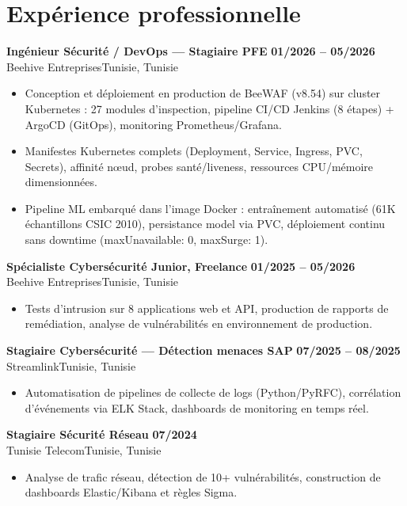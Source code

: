 \documentclass[a4paper,10pt]{article}
\newcommand{\cventry}[4]{\textbf{#1} \hfill \textbf{#4}\\[1pt]#2{\ifx\relax#3\relax\else, #3\fi}\par\vspace{1pt}}
\begin{document}
\section{Expérience professionnelle}
\cventry{Ingénieur Sécurité / DevOps --- Stagiaire PFE}{Beehive Entreprises}{Tunisie}{01/2026 -- 05/2026}
\begin{itemize}
  \item Conception et déploiement en production de BeeWAF (v8.54) sur cluster Kubernetes : 27 modules d'inspection, pipeline CI/CD Jenkins (8 étapes) + ArgoCD (GitOps), monitoring Prometheus/Grafana.
  \item Manifestes Kubernetes complets (Deployment, Service, Ingress, PVC, Secrets), affinité nœud, probes santé/liveness, ressources CPU/mémoire dimensionnées.
  \item Pipeline ML embarqué dans l'image Docker : entraînement automatisé (61K échantillons CSIC 2010), persistance model via PVC, déploiement continu sans downtime (maxUnavailable: 0, maxSurge: 1).
\end{itemize}
\cventry{Spécialiste Cybersécurité Junior, Freelance}{Beehive Entreprises}{Tunisie}{01/2025 -- 05/2026}
\begin{itemize}
  \item Tests d'intrusion sur 8 applications web et API, production de rapports de remédiation, analyse de vulnérabilités en environnement de production.
\end{itemize}
\cventry{Stagiaire Cybersécurité --- Détection menaces SAP}{Streamlink}{Tunisie}{07/2025 -- 08/2025}
\begin{itemize}
  \item Automatisation de pipelines de collecte de logs (Python/PyRFC), corrélation d'événements via ELK Stack, dashboards de monitoring en temps réel.
\end{itemize}
\cventry{Stagiaire Sécurité Réseau}{Tunisie Telecom}{Tunisie}{07/2024}
\begin{itemize}
  \item Analyse de trafic réseau, détection de 10+ vulnérabilités, construction de dashboards Elastic/Kibana et règles Sigma.
\end{itemize}
\end{document}
